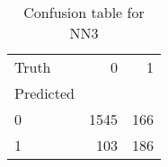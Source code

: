 \begin{table}[h!]
\caption{Confusion table for NN3}
\label{tab:NN3}
\begin{tabular}{lrr}
\toprule
Truth & 0 & 1 \\
Predicted &  &  \\
\midrule
0 & 1545 & 166 \\
1 & 103 & 186 \\
\bottomrule
\end{tabular}
\end{table}
